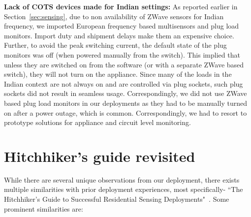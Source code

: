 \documentclass[10pt]{sensys-proc}
\newcommand{\secref}[1]{Section~\ref{#1}}
\begin{document}
\noindent \textbf{Lack of COTS devices made for Indian settings:} As reported earlier in \secref{sec:sensing}, due to non availability of ZWave sensors for Indian frequency, we imported European frequency based multisensors and plug load monitors. Import duty and shipment delays make them an expensive choice. Further, to avoid the peak switching current, the default state of the plug monitors was off (when powered manually from the switch). This implied that unless they are switched on from the software (or with a separate ZWave based switch), they will not turn on the appliance. Since many of the loads in the Indian context are not always on and are controlled via plug sockets, such plug sockets did not result in seamless usage. Correspondingly, we did not use ZWave based plug load monitors in our deployments as they had to be manually turned on after a power outage, which is common. %
Correspondingly, we had to resort to prototype solutions for appliance and circuit level monitoring.
\vspace{-1mm}
\section{Hitchhiker's guide revisited}
\label{sec:common}
While there are several unique observations from our deployment, there exists multiple similarities with prior deployment experiences, most specifically- ``The Hitchhiker's Guide to Successful Residential Sensing Deployments"~\cite{hitchhiker_residential}. Some prominent similarities are:
\end{document}
